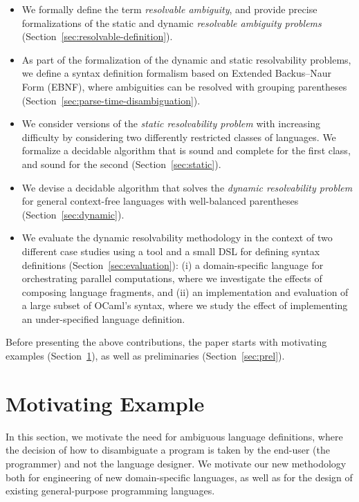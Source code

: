 \documentclass[acmsmall,review,anonymous]{acmart}\settopmatter{printfolios=true,printccs=false,printacmref=false}
\begin{document}
\begin{itemize}
\item We formally define the term \emph{resolvable ambiguity}, and
  provide precise formalizations of the static and dynamic
  \emph{resolvable ambiguity problems}
  (Section~\ref{sec:resolvable-definition}).
\item As part of the formalization of the dynamic and static resolvability problems, we define a syntax definition formalism based on Extended Backus–Naur Form (EBNF), where ambiguities can be resolved with grouping parentheses (Section~\ref{sec:parse-time-disambiguation}).
\item We consider versions of the \emph{static resolvability
    problem} with increasing difficulty by considering two
  differently restricted classes of languages. We formalize a
  decidable algorithm that is sound and complete for the first
  class, and sound for the second (Section~\ref{sec:static}).
\item We devise a decidable algorithm that solves the
  \emph{dynamic resolvability problem} for general context-free
  languages with well-balanced parentheses
  (Section~\ref{sec:dynamic}).
\item We evaluate the dynamic resolvability methodology in the context of two
  different case studies using a tool and a small DSL for defining
  syntax definitions (Section~\ref{sec:evaluation}): (i) a
  domain-specific language for orchestrating parallel
  computations, where we investigate the effects of composing
  language fragments, and (ii) an implementation and evaluation of
  a large subset of OCaml's syntax, where we study the effect of
  implementing an under-specified language definition.
\end{itemize}

\noindent Before presenting the above contributions, the paper starts with motivating examples (Section~\ref{sec:motivation}), as well as preliminaries (Section~\ref{sec:prel}).




\section{Motivating Example}
\label{sec:motivation}
In this section, we motivate the need for ambiguous language definitions, where the decision of how to disambiguate a program is taken by the end-user (the programmer) and not the language designer. We motivate our new methodology both for engineering of new domain-specific languages, as well as for the design of existing general-purpose programming languages.
\end{document}
